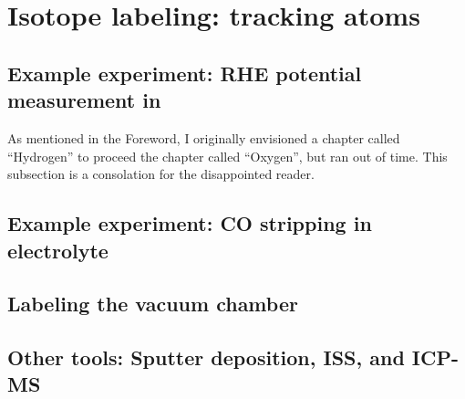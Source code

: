 \section{Isotope labeling: tracking atoms}




\subsection{Example experiment: RHE potential measurement in }
As mentioned in the Foreword, I originally envisioned a chapter called ``Hydrogen'' to proceed the chapter called ``Oxygen'', but ran out of time. This subsection is a consolation for the disappointed reader.

\subsection{Example experiment: CO stripping in  electrolyte}\label{subsec:isotope_CO2}


\subsection{Labeling the vacuum chamber}\label{subsec:vacuum_transport}


\subsection{Other tools: Sputter deposition, ISS, and ICP-MS}\label{subsec:other_tools}
